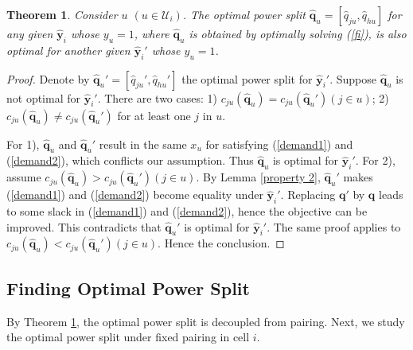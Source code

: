 \documentclass[10pt,journal,final,finalsubmission,twocolumn]{IEEEtran}
\newtheorem{theorem}{Theorem}
\begin{document}
\begin{theorem}\label{decouple}
Consider $u$ $(u\in \mathcal{U}_i)$. The optimal power split $\hat{\boldsymbol{q}}_u = [\hat{q}_{ju},\hat{q}_{hu}]$ for any given $\hat{\boldsymbol{y}}_i$ whose $y_u=1$, where $\hat{\boldsymbol{q}}_u$ is obtained by optimally solving (\ref{fi}), is also optimal for another given $\hat{\boldsymbol{y}}_i'$ whose $y_u=1$.
\end{theorem}
\begin{proof}
Denote by $\hat{\boldsymbol{q}}_u'=[\hat{q}_{ju}',\hat{q}_{hu}']$ the optimal power split for $\hat{\boldsymbol{y}}_i'$. Suppose $\hat{\boldsymbol{q}}_u$ is not optimal for $\hat{\boldsymbol{y}}_i'$. There are two cases: 1) $c_{ju}\left ( \hat{\boldsymbol{q}}_u \right ) = c_{ju}\left ( {\hat{\boldsymbol{q}}_u}' \right )\left (j\in u\right)$; 2) $c_{ju}\left ( {\hat{\boldsymbol{q}}_u} \right ) \neq c_{ju}\left ( {\hat{\boldsymbol{q}}_u}' \right )$ for at least one $j$ in $u$.

For 1), ${\hat{\boldsymbol{q}}_u}$ and ${\hat{\boldsymbol{q}}_u}'$ result in the same $x_u$ for satisfying (\ref{demand1}) and (\ref{demand2}), which conflicts our assumption. Thus ${\hat{\boldsymbol{q}}_u}$ is optimal for $\hat{\boldsymbol{y}}_i'$. For 2), assume $c_{ju}\left ( {\hat{\boldsymbol{q}}_u} \right ) > c_{ju}\left ( {\hat{\boldsymbol{q}}_u}' \right )\left (j\in u\right)$. By Lemma \ref{property 2}, ${\hat{\boldsymbol{q}}_u}'$ makes (\ref{demand1}) and (\ref{demand2}) become equality under $\hat{\boldsymbol{y}}_i'$. Replacing ${\boldsymbol{q}}'$ by ${\boldsymbol{q}}$ leads to some slack in (\ref{demand1}) and (\ref{demand2}), hence the objective can be improved. This contradicts that $\hat{\boldsymbol{q}}_u'$ is optimal for $\hat{\boldsymbol{y}}_i'$. The same proof applies to $c_{ju}\left ( \hat{\boldsymbol{q}}_u \right ) < c_{ju}\left (\hat{\boldsymbol{q}}_u' \right )\left (j\in u\right)$. Hence the conclusion.
\end{proof}

\subsection{Finding Optimal Power Split}\label{OptimalPowerSplit}

By Theorem \ref{decouple}, the optimal power split is decoupled from pairing. Next, we study the optimal power split under fixed pairing in cell $i$. 
\end{document}

